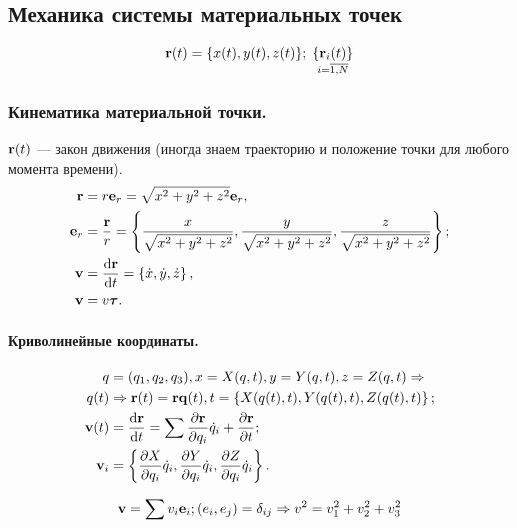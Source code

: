 \subsection{Механика системы материальных точек}
\begin{equation*}
\vb{r}(t) = \{x(t), y(t), z(t) \}; \thickspace \mathop{\{\vb{r}_i(t)\}}\limits_{i = \overline{1{,}N}}
\end{equation*}  

\subsubsection{Кинематика материальной точки.}
$\vb{r}(t)$ --- закон движения (иногда знаем траекторию и положение точки для любого момента времени). 
\begin{align*}
\vb{r} &= r \vb{e}_r = \sqrt{x^2 + y^2 + z^2} \vb{e}_r, \\
\vb{e}_r &= \frac{\vb{r}}{r} = \left\{ \frac{x}{\sqrt{x^2 + y^2 + z^2}}, \frac{y}{\sqrt{x^2 + y^2 + z^2}}, \frac{z}{\sqrt{x^2 + y^2 + z^2}} \right\};\\
\vb{v} &= \dv{\vb{r}}{t} = \left\{\dot x, \dot y, \dot z\right\},\\
\vb{v} &= v \vb*{\tau}.
\end{align*}

\paragraph{Криволинейные координаты.}
\begin{align*}
q &= (q_1, q_2, q_3), x =X(q, t), y = Y(q, t), z =Z(q, t) \Rightarrow \\
q(t) &\Rightarrow \vb{r}(t) = \vb{r}{\vb{q}(t), t} = \left\{X(q(t), t), Y(q(t), t), Z(q(t), t)\right\}; \\
\vb{v}(t) &= \dv{\vb{r}}{t} = \sum \pdv{\vb{r}}{q_i} \dot q_i + \pdv{\vb{r}}{t}; \\
\vb{v}_i &= \left\{\pdv{X}{q_i} \dot q_i, \pdv{Y}{q_i} \dot q_i, \pdv{Z}{q_i} \dot q_i \right\}.
\end{align*}

\begin{equation*}
\vb{v} = \sum v_i \vb{e}_i; (e_i, e_j) = \delta_{ij} \Rightarrow v^2 = v_1^2 + v_2^2 + v_3^2
\end{equation*}

